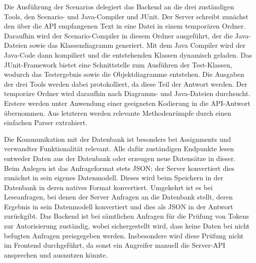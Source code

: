 Die Ausführung der Scenarios delegiert das Backend an die drei zuständigen Tools,
den Scenario- und Java-Compiler und JUnit.
Der Server schreibt zunächst den über die API empfangenen Text in eine Datei in einem temporären Ordner.
Daraufhin wird der Scenario-Compiler in diesem Ordner ausgeführt,
der die Java-Dateien sowie das Klassendiagramm generiert.
Mit dem Java Compiler wird der Java-Code dann kompiliert und die entstehenden Klassen dynamisch geladen.
Das JUnit-Framework bietet eine Schnittstelle zum Ausführen der Test-Klassen,
wodurch das Testergebnis sowie die Objektdiagramme entstehen.
Die Ausgaben der drei Tools werden dabei protokolliert, da diese Teil der Antwort werden.
Der temporäre Ordner wird daraufhin nach Diagramm- und Java-Dateien durchsucht.
Erstere werden unter Anwendung einer geeigneten Kodierung in die API-Antwort übernommen.
Aus letzteren werden relevante Methodenrümpfe durch einen einfachen Parser extrahiert.

Die Kommunikation mit der Datenbank ist besonders bei Assignments und verwandter Funktionalität relevant.
Alle dafür zuständigen Endpunkte lesen entweder Daten aus der Datenbank oder erzeugen neue Datensätze in dieser.
Beim Anlegen ist das Anfrageformat stets JSON;
der Server konvertiert dies zunächst in sein eigenes Datenmodell.
Dieses wird beim Speichern in der Datenbank in deren natives Format konvertiert.
Umgekehrt ist es bei Leseanfragen, bei denen der Server Anfragen an die Datenbank stellt,
deren Ergebnis in sein Datenmodell konvertiert und dies als JSON in der Antwort zurückgibt.
Das Backend ist bei sämtlichen Anfragen für die Prüfung von Tokens zur Autorisierung zuständig,
wobei sichergestellt wird, dass keine Daten bei nicht befugten Anfragen preisgegeben werden.
Insbesondere wird diese Prüfung nicht im Frontend durchgeführt,
da sonst ein Angreifer manuell die Server-API ansprechen und ausnutzen könnte.
